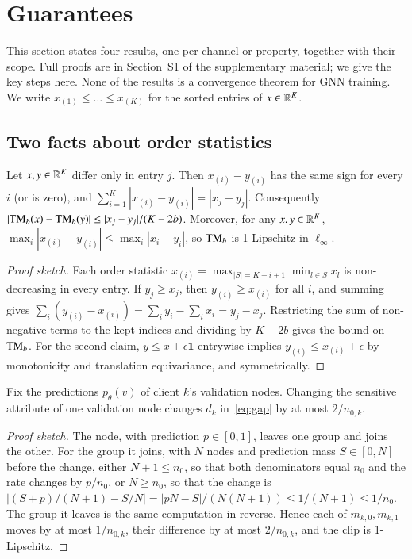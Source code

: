 \section{Guarantees}\label{sec:guarantees}

This section states four results, one per channel or property, together with their scope. Full proofs are in Section~S1 of the supplementary material; we give the key steps here. None of the results is a convergence theorem for GNN training. We write $x_{(1)}\le\dots\le x_{(K)}$ for the sorted entries of $x\in\mathbb{R}^K$.

\subsection{Two facts about order statistics}

\begin{lemma}\label{lem:sort}
Let $x,y\in\mathbb{R}^K$ differ only in entry $j$. Then $x_{(i)}-y_{(i)}$ has the same sign for every $i$ (or is zero), and $\sum_{i=1}^K|x_{(i)}-y_{(i)}|=|x_j-y_j|$. Consequently $|\mathrm{TM}_b(x)-\mathrm{TM}_b(y)|\le|x_j-y_j|/(K-2b)$. Moreover, for any $x,y\in\mathbb{R}^K$, $\max_i|x_{(i)}-y_{(i)}|\le\max_i|x_i-y_i|$, so $\mathrm{TM}_b$ is 1-Lipschitz in $\ell_\infty$.
\end{lemma}

\begin{proof}[Proof sketch]
Each order statistic $x_{(i)}=\max_{|S|=K-i+1}\min_{l\in S}x_l$ is non-decreasing in every entry. If $y_j\ge x_j$, then $y_{(i)}\ge x_{(i)}$ for all $i$, and summing gives $\sum_i(y_{(i)}-x_{(i)})=\sum_i y_i-\sum_i x_i=y_j-x_j$. Restricting the sum of non-negative terms to the kept indices and dividing by $K-2b$ gives the bound on $\mathrm{TM}_b$. For the second claim, $y\le x+\epsilon\mathbf 1$ entrywise implies $y_{(i)}\le x_{(i)}+\epsilon$ by monotonicity and translation equivariance, and symmetrically.
\end{proof}

\begin{lemma}\label{lem:dk}
Fix the predictions $p_\theta(v)$ of client $k$'s validation nodes. Changing the sensitive attribute of one validation node changes $d_k$ in~\eqref{eq:gap} by at most $2/n_{0,k}$.
\end{lemma}

\begin{proof}[Proof sketch]
The node, with prediction $p\in[0,1]$, leaves one group and joins the other. For the group it joins, with $N$ nodes and prediction mass $S\in[0,N]$ before the change, either $N+1\le n_0$, so that both denominators equal $n_0$ and the rate changes by $p/n_0$, or $N\ge n_0$, so that the change is $|(S+p)/(N+1)-S/N|=|pN-S|/(N(N+1))\le1/(N+1)\le1/n_0$. The group it leaves is the same computation in reverse. Hence each of $m_{k,0},m_{k,1}$ moves by at most $1/n_{0,k}$, their difference by at most $2/n_{0,k}$, and the clip is 1-Lipschitz.
\end{proof}

